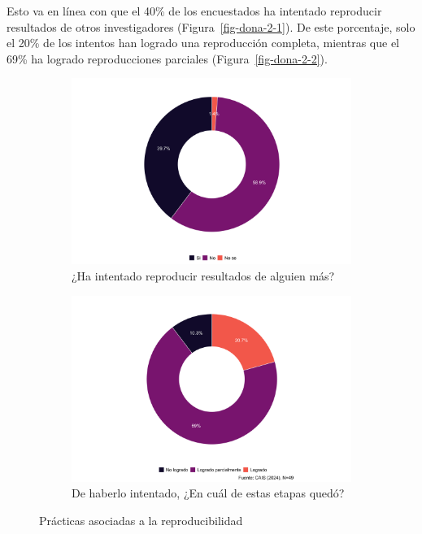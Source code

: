 \documentclass[
  letterpaper,
  DIV=11,
  numbers=noendperiod]{scrreprt}
\begin{document}
Esto va en línea con que el 40\% de los encuestados ha intentado
reproducir resultados de otros investigadores
(Figura~\ref{fig-dona-2-1}). De este porcentaje, solo el 20\% de los
intentos han logrado una reproducción completa, mientras que el 69\% ha
logrado reproducciones parciales (Figura~\ref{fig-dona-2-2}).

\begin{figure}

{\centering 

\begin{figure}

{\centering \includegraphics{paper_files/figure-pdf/fig-dona-2-1.png}

}

\caption{¿Ha intentado reproducir resultados de alguien más?}

\end{figure}

\begin{figure}

{\centering \includegraphics{paper_files/figure-pdf/fig-dona-2-2.png}

}

\caption{De haberlo intentado, ¿En cuál de estas etapas quedó?}

\end{figure}

}

\caption{\label{fig-dona-2}Prácticas asociadas a la reproducibilidad}

\end{figure}
\end{document}
